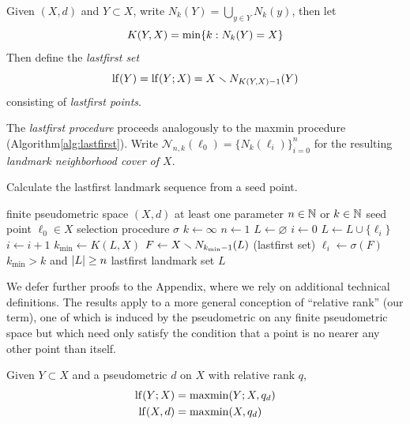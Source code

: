 \documentclass{article}
\begin{document}
\begin{definition}
    Given $(X,d)$ and $Y \subset X$, write $N_k(Y) = \bigcup_{y \in Y}{N_k(y)}$, then let
    $$K(Y,X) = \min\{ k : N_k(Y) = X \}$$
    Then define the \emph{lastfirst set}
    $$\operatorname{lf}(Y) = \operatorname{lf}(Y;X) = X \smallsetminus N_{K(Y,X) - 1}(Y)$$
    consisting of \emph{lastfirst points}.
\end{definition}

The \emph{lastfirst procedure} proceeds analogously to the maxmin
procedure (Algorithm\nbs\ref{alg:lastfirst}). Write
\(\mathcal{N}_{n,k}(\ell_0) = \{ N_k(\ell_i) \}_{i=0}^{n}\) for the
resulting \emph{landmark neighborhood cover of \(X\)}.

\begin{algorithm}
\caption{Calculate the lastfirst landmark sequence from a seed point.}
\label{alg:lastfirst}
\begin{algorithmic}[1]
\REQUIRE finite pseudometric space $(X,d)$
\REQUIRE at least one parameter $n \in \mathbb{N}$ or $k \in \mathbb{N}$
\REQUIRE seed point $\ell_0 \in X$
\REQUIRE selection procedure $\sigma$
    \STATE $k \leftarrow \infty$
\ENDIF
{}
    \STATE $n \leftarrow 1$
\ENDIF
\STATE $L \leftarrow \varnothing$
\STATE $i \leftarrow 0$
\REPEAT
    \STATE $L \leftarrow L\cup\{\ell_i\}$
    \STATE $i \leftarrow i+1$
    \STATE $k_{\min} \leftarrow K(L,X)$
    \STATE $F \leftarrow X \smallsetminus N_{k_{\min}-1}(L)$ (lastfirst set)
    \STATE $\ell_i \leftarrow \sigma(F)$
\UNTIL $k_{\min} > k$ and $\lvert L\rvert \geq n$
\RETURN lastfirst landmark set $L$
\end{algorithmic}
\end{algorithm}

We defer further proofs to the Appendix, where we rely on additional
technical definitions. The results apply to a more general conception of
``relative rank'' (our term), one of which is induced by the
pseudometric on any finite pseudometric space but which need only
satisfy the condition that a point is no nearer any other point than
itself.

\begin{corollary}
    Given $Y\subset X$ and a pseudometric $d$ on $X$ with relative rank $q$,
    \begin{align*}
        \operatorname{lf}(Y;X) &= \operatorname{maxmin}(Y;X,q_d) \\
        \operatorname{lf}(X,d) &= \operatorname{maxmin}(X,q_d)
    \end{align*}
\end{corollary}
\end{document}
